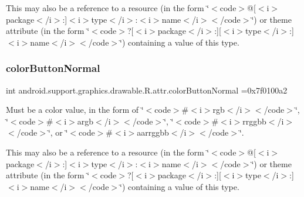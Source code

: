 This may also be a reference to a resource (in the form \char`\"{}$<$code$>$@\mbox{[}$<$i$>$package$<$/i$>$\+:\mbox{]}$<$i$>$type$<$/i$>$\+:$<$i$>$name$<$/i$>$$<$/code$>$\char`\"{}) or theme attribute (in the form \char`\"{}$<$code$>$?\mbox{[}$<$i$>$package$<$/i$>$\+:\mbox{]}\mbox{[}$<$i$>$type$<$/i$>$\+:\mbox{]}$<$i$>$name$<$/i$>$$<$/code$>$\char`\"{}) containing a value of this type. \mbox{\label{classandroid_1_1support_1_1graphics_1_1drawable_1_1R_1_1attr_a43c982b9f339efea371ad7e16b67b736}} 
\subsubsection{\texorpdfstring{color\+Button\+Normal}{colorButtonNormal}}
{\footnotesize\ttfamily int android.\+support.\+graphics.\+drawable.\+R.\+attr.\+color\+Button\+Normal =0x7f0100a2\hspace{0.3cm}{\ttfamily [static]}}

Must be a color value, in the form of \char`\"{}$<$code$>$\#$<$i$>$rgb$<$/i$>$$<$/code$>$\char`\"{}, \char`\"{}$<$code$>$\#$<$i$>$argb$<$/i$>$$<$/code$>$\char`\"{}, \char`\"{}$<$code$>$\#$<$i$>$rrggbb$<$/i$>$$<$/code$>$\char`\"{}, or \char`\"{}$<$code$>$\#$<$i$>$aarrggbb$<$/i$>$$<$/code$>$\char`\"{}. 

This may also be a reference to a resource (in the form \char`\"{}$<$code$>$@\mbox{[}$<$i$>$package$<$/i$>$\+:\mbox{]}$<$i$>$type$<$/i$>$\+:$<$i$>$name$<$/i$>$$<$/code$>$\char`\"{}) or theme attribute (in the form \char`\"{}$<$code$>$?\mbox{[}$<$i$>$package$<$/i$>$\+:\mbox{]}\mbox{[}$<$i$>$type$<$/i$>$\+:\mbox{]}$<$i$>$name$<$/i$>$$<$/code$>$\char`\"{}) containing a value of this type. \mbox{\label{classandroid_1_1support_1_1graphics_1_1drawable_1_1R_1_1attr_afcd0fe7a377ac729bf04bf31caa03b11}} 
